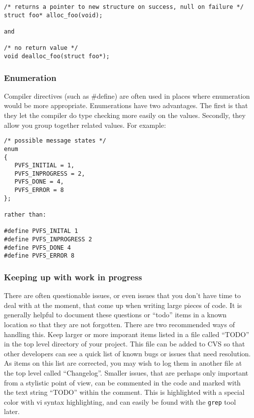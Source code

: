 \documentclass[11pt, letterpaper]{article}
\begin{document}
\begin{verbatim}
/* returns a pointer to new structure on success, null on failure */
struct foo* alloc_foo(void);  

and

/* no return value */
void dealloc_foo(struct foo*);
\end{verbatim}

\subsubsection{Enumeration}

Compiler directives (such as \#define) are often used in places where
enumeration would be more appropriate.  Enumerations have two
advantages.  The first is that they let the compiler do type checking
more easily on the values.  Secondly, they allow you group together
related values.  For example:

\begin{verbatim}
/* possible message states */
enum
{
   PVFS_INITIAL = 1,
   PVFS_INPROGRESS = 2,
   PVFS_DONE = 4,
   PVFS_ERROR = 8
};

rather than:

#define PVFS_INITAL 1
#define PVFS_INPROGRESS 2
#define PVFS_DONE 4
#define PVFS_ERROR 8
\end{verbatim}

\subsubsection{Keeping up with work in progress}

There are often questionable issues, or even issues that you don't have
time to deal with at the moment, that come up when writing large pieces
of code.  It is generally helpful to document these questions or
``todo''
items in a known location so that they are not forgotten.  There are two
recommended ways of handling this.  Keep larger or more imporant items
listed in a file called ``TODO'' in the top level directory of your
project.  This file can be added to CVS so that other developers can see
a quick list of known bugs or issues that need resolution.  As items on
this list are corrected, you may wish to log them in another file at the
top level called ``Changelog''.  Smaller issues, that are perhaps only
important from a stylistic point of view, can be commented in the code
and marked with the text string ``TODO'' within the comment.  This is highlighted with a
special color with vi syntax highlighting, and can easily be found with
the {\tt grep} tool later.
\end{document}
